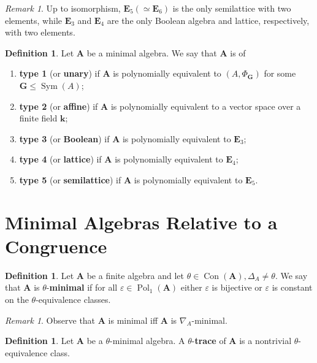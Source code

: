 \documentclass{amsart}
\theoremstyle{plain}
\theoremstyle{definition}
\newtheorem{definition}[theorem]{Definition}
\theoremstyle{remark}
\newtheorem{remark}[theorem]{Remark}
\def\epsilon{\varepsilon}
\DeclareMathOperator{\Con}{Con}
\DeclareMathOperator{\Pol}{Pol}
\DeclareMathOperator{\Sym}{Sym}
\DeclareMathOperator{\M}{M}
\begin{document}
\begin{remark}
    Up to isomorphism, $\mathbf{E}_5 (\simeq \mathbf{E}_6)$ is the only semilattice with two elements, while $\mathbf{E}_3$ and $\mathbf{E}_4$ are the only Boolean algebra and lattice, respectively, with two elements. 
\end{remark}

\begin{definition}
    \label{defn_type}
    Let $\mathbf{A}$ be a minimal algebra. 
    We say that $\mathbf{A}$ is of 
    \begin{enumerate}
        \item \textbf{type 1} (or \textbf{unary}) if $\mathbf{A}$ is polynomially equivalent to $(A, \Phi_\mathbf{G})$ for some $\mathbf{G} \le \Sym(A)$; 
        \item \textbf{type 2} (or \textbf{affine}) if $\mathbf{A}$ is polynomially equivalent to a vector space over a finite field $\mathbf{k}$; 
        \item \textbf{type 3} (or \textbf{Boolean}) if $\mathbf{A}$ is polynomially equivalent to $\mathbf{E}_3$;
        \item \textbf{type 4} (or \textbf{lattice}) if $\mathbf{A}$ is polynomially equivalent to $\mathbf{E}_4$;
        \item \textbf{type 5} (or \textbf{semilattice}) if $\mathbf{A}$ is polynomially equivalent to $\mathbf{E}_5$. 
    \end{enumerate}
\end{definition}

\section{Minimal Algebras Relative to a Congruence}
\begin{definition}
    Let $\mathbf{A}$ be a finite algebra and let $ \theta \in \Con(\mathbf{A}), \Delta_A \neq \theta$. 
    We say that $\mathbf{A}$ is $\theta$-\textbf{minimal} if for all $\epsilon \in \Pol_1(\mathbf{A})$ either $\epsilon$ is bijective or $\epsilon$ is constant on the $\theta$-equivalence classes. 
\end{definition}

\begin{remark}
    Observe that $\mathbf{A}$ is minimal iff $\mathbf{A}$ is $\nabla_A$-minimal. 
\end{remark}

\begin{definition}
    Let $\mathbf{A}$ be a $\theta$-minimal algebra. 
    A $\theta$-\textbf{trace} of $\mathbf{A}$ is 
    a nontrivial $\theta$-equivalence class.  
\end{definition}
\end{document}
